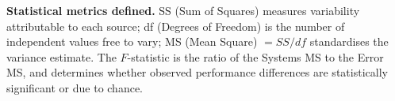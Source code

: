 \noindent\textbf{Statistical metrics defined.} SS (Sum of Squares) measures variability attributable to each source; df (Degrees of Freedom) is the number of independent values free to vary; MS (Mean Square) $= SS/df$ standardises the variance estimate. The $F$-statistic is the ratio of the Systems MS to the Error MS, and determines whether observed performance differences are statistically significant or due to chance.

\clearpage
